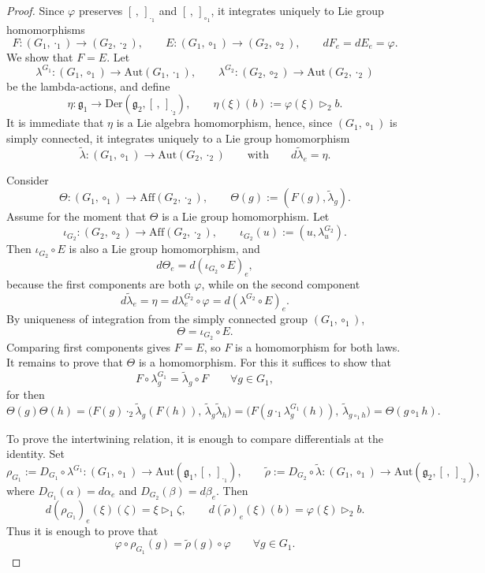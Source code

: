 \documentclass[10pt,a4paper]{amsart}
\begin{document}
\begin{proof}
Since $\varphi$ preserves $[\,,\,]_{\cdot_1}$ and $[\,,\,]_{\circ_1}$, it integrates uniquely to Lie group
homomorphisms
\[
F:(G_1,\cdot_1)\to (G_2,\cdot_2),
\qquad
E:(G_1,\circ_1)\to (G_2,\circ_2),
\qquad
dF_e=dE_e=\varphi.
\]
We show that $F=E$. Let
\[
\lambda^{G_1}:(G_1,\circ_1)\to \mathrm{Aut}(G_1,\cdot_1),
\qquad
\lambda^{G_2}:(G_2,\circ_2)\to \mathrm{Aut}(G_2,\cdot_2)
\]
be the lambda-actions, and define
\[
\eta:\mathfrak g_1\to \mathrm{Der}(\mathfrak g_2,[\,,\,]_{\cdot_2}),
\qquad
\eta(\xi)(b):=\varphi(\xi)\triangleright_2 b .
\]
It is immediate that $\eta$ is a Lie algebra homomorphism, hence, since $(G_1,\circ_1)$ is simply
connected, it integrates uniquely to a Lie group homomorphism
\[
\widetilde{\lambda}:(G_1,\circ_1)\to \mathrm{Aut}(G_2,\cdot_2)
\qquad\text{with}\qquad
d\widetilde{\lambda}_e=\eta .
\]

Consider
\[
\Theta:(G_1,\circ_1)\to \mathrm{Aff}(G_2,\cdot_2),
\qquad
\Theta(g):=(F(g),\widetilde{\lambda}_g).
\]
Assume for the moment that $\Theta$ is a Lie group homomorphism. Let
\[
\iota_{G_2}:(G_2,\circ_2)\to \mathrm{Aff}(G_2,\cdot_2),
\qquad
\iota_{G_2}(u):=(u,\lambda^{G_2}_u).
\]
Then $\iota_{G_2}\circ E$ is also a Lie group homomorphism, and
\[
d\Theta_e=d(\iota_{G_2}\circ E)_e,
\]
because the first components are both $\varphi$, while on the second component
\[
d\widetilde{\lambda}_e=\eta=d\lambda^{G_2}_e\circ \varphi=d(\lambda^{G_2}\circ E)_e.
\]
By uniqueness of integration from the simply connected group $(G_1,\circ_1)$,
\[
\Theta=\iota_{G_2}\circ E.
\]
Comparing first components gives $F=E$, so $F$ is a homomorphism for both laws. It remains to prove that $\Theta$ is a homomorphism. For this it suffices to show that
\[
F\circ \lambda^{G_1}_g=\widetilde{\lambda}_g\circ F
\qquad\forall g\in G_1,
\]
for then
\[
\Theta(g)\Theta(h)
=
\bigl(F(g)\cdot_2 \widetilde{\lambda}_g(F(h)),\,\widetilde{\lambda}_g\widetilde{\lambda}_h\bigr)
=
\bigl(F(g\cdot_1 \lambda^{G_1}_g(h)),\,\widetilde{\lambda}_{g\circ_1 h}\bigr)
=
\Theta(g\circ_1 h).
\]

To prove the intertwining relation, it is enough to compare differentials at the identity. Set
\[
\rho_{G_1}:=D_{G_1}\circ \lambda^{G_1}:(G_1,\circ_1)\to \mathrm{Aut}(\mathfrak g_1,[\,,\,]_{\cdot_1}),
\qquad
\widetilde{\rho}:=D_{G_2}\circ \widetilde{\lambda}:(G_1,\circ_1)\to \mathrm{Aut}(\mathfrak g_2,[\,,\,]_{\cdot_2}),
\]
where $D_{G_1}(\alpha)=d\alpha_e$ and $D_{G_2}(\beta)=d\beta_e$. Then
\[
d(\rho_{G_1})_e(\xi)(\zeta)=\xi\triangleright_1 \zeta,
\qquad
d(\widetilde{\rho})_e(\xi)(b)=\varphi(\xi)\triangleright_2 b.
\]
Thus it is enough to prove that
\[
\varphi\circ \rho_{G_1}(g)=\widetilde{\rho}(g)\circ \varphi
\qquad\forall g\in G_1.
\]


\end{proof}
\end{document}
